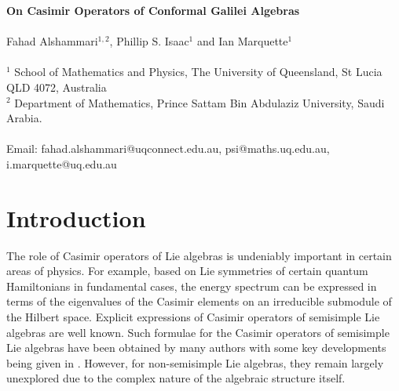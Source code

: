 \documentclass[12pt]{article}
\begin{document}
\begin{center}
{\large\bf On Casimir Operators of Conformal Galilei Algebras 
}\\
~~\\

{\large Fahad Alshammari$^{1,2}$,  Phillip S. Isaac$^1$ and Ian Marquette$^1$}\\
~~\\
$^1$ 
School of Mathematics and Physics, The University of Queensland, St Lucia QLD 4072, Australia \\
$^2$ 
Department of Mathematics, Prince Sattam Bin Abdulaziz University, Saudi Arabia. \\
~~\\
{\small Email: fahad.alshammari@uqconnect.edu.au, psi@maths.uq.edu.au, i.marquette@uq.edu.au}
\end{center}
 

\begin{abstract}

In previous work, we introduced an algorithm that utilises differential
	operator realisations to find polynomial Casimir operators of Lie
	algebras. In this article we build on this work by applying the
	algorithm to several classes of finite dimensional conformal Galilei
	algebras with central extension. In these cases we highlight the
	utility of an algebra anti-automorphism, and give relevant details
	through key examples.
 

\end{abstract}

\section{Introduction}
The role of Casimir operators of Lie algebras is undeniably important in
certain areas of physics. 
For example, based on Lie symmetries of certain quantum Hamiltonians in
fundamental cases, the energy
spectrum can be expressed in terms of the eigenvalues of the Casimir elements
on an irreducible submodule of the Hilbert space. 
Explicit expressions of Casimir operators of
semisimple Lie algebras are well known. 
Such formulae for the Casimir
operators of semisimple Lie algebras have been obtained by many authors 
with some key developments being given in
\cite{ Gr64, Ok77, Po66 ,Ra49}. 
However, for non-semisimple Lie algebras, they remain largely unexplored due
to the complex nature of the algebraic structure itself.
\end{document}

